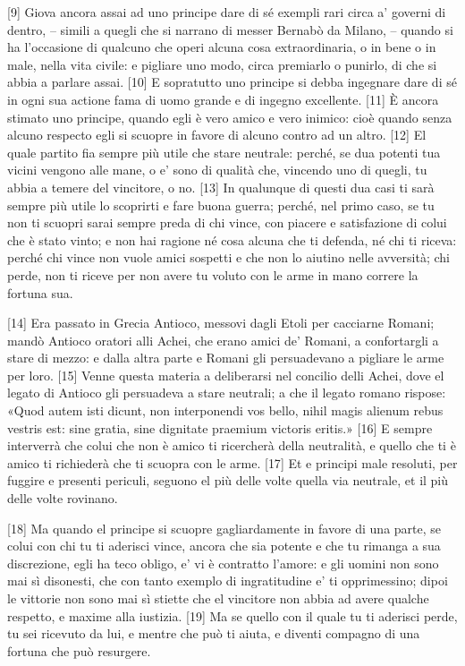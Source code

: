 {[}9{]} Giova ancora assai ad uno principe dare di sé exempli rari circa
a' governi di dentro, -- simili a quegli che si narrano di messer
Bernabò da Milano, -- quando si ha l'occasione di qualcuno che operi
alcuna cosa extraordinaria, o in bene o in male, nella vita civile: e
pigliare uno modo, circa premiarlo o punirlo, di che si abbia a parlare
assai. {[}10{]} E sopratutto uno principe si debba ingegnare dare di sé
in ogni sua actione fama di uomo grande e di ingegno excellente.
{[}11{]} È ancora stimato uno principe, quando egli è vero amico e vero
inimico: cioè quando senza alcuno respecto egli si scuopre in favore di
alcuno contro ad un altro. {[}12{]} El quale partito fia sempre più
utile che stare neutrale: perché, se dua potenti tua vicini vengono alle
mane, o e' sono di qualità che, vincendo uno di quegli, tu abbia a
temere del vincitore, o no. {[}13{]} In qualunque di questi dua casi ti
sarà sempre più utile lo scoprirti e fare buona guerra; perché, nel
primo caso, se tu non ti scuopri sarai sempre preda di chi vince, con
piacere e satisfazione di colui che è stato vinto; e non hai ragione né
cosa alcuna che ti defenda, né chi ti riceva: perché chi vince non vuole
amici sospetti e che non lo aiutino nelle avversità; chi perde, non ti
riceve per non avere tu voluto con le arme in mano correre la fortuna
sua.

{[}14{]} Era passato in Grecia Antioco, messovi dagli Etoli per
cacciarne Romani; mandò Antioco oratori alli Achei, che erano amici de'
Romani, a confortargli a stare di mezzo: e dalla altra parte e Romani
gli persuadevano a pigliare le arme per loro. {[}15{]} Venne questa
materia a deliberarsi nel concilio delli Achei, dove el legato di
Antioco gli persuadeva a stare neutrali; a che il legato romano rispose:
«Quod autem isti dicunt, non interponendi vos bello, nihil magis alienum
rebus vestris est: sine gratia, sine dignitate praemium victoris
eritis.» {[}16{]} E sempre interverrà che colui che non è amico ti
ricercherà della neutralità, e quello che ti è amico ti richiederà che
ti scuopra con le arme. {[}17{]} Et e principi male resoluti, per
fuggire e presenti periculi, seguono el più delle volte quella via
neutrale, et il più delle volte rovinano.

{[}18{]} Ma quando el principe si scuopre gagliardamente in favore di
una parte, se colui con chi tu ti aderisci vince, ancora che sia potente
e che tu rimanga a sua discrezione, egli ha teco obligo, e' vi è
contratto l'amore: e gli uomini non sono mai sì disonesti, che con tanto
exemplo di ingratitudine e' ti opprimessino; dipoi le vittorie non sono
mai sì stiette che el vincitore non abbia ad avere qualche respetto, e
maxime alla iustizia. {[}19{]} Ma se quello con il quale tu ti aderisci
perde, tu sei ricevuto da lui, e mentre che può ti aiuta, e diventi
compagno di una fortuna che può resurgere.


